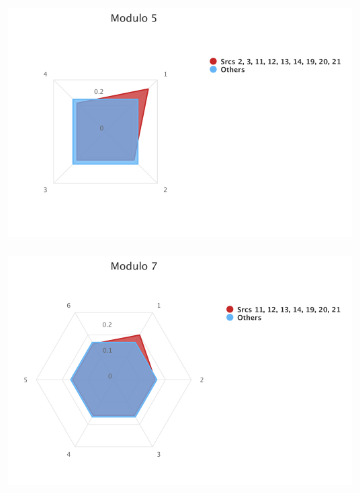 \begin{figure}[H]
\begin{subfigure}{0.45\textwidth}
	\includegraphics[width=\linewidth]{tex/images/analysis/mod5}
\end{subfigure}
\hfill
\begin{subfigure}{0.45\textwidth}
	\includegraphics[width=\linewidth]{tex/images/analysis/mod7}
\end{subfigure}\\


\end{figure}
